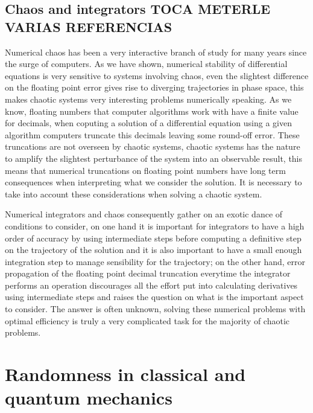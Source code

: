 \subsection{Chaos and integrators TOCA METERLE VARIAS REFERENCIAS}

Numerical chaos has been a very interactive branch of study for many years since the surge of computers. As we have shown, numerical stability of differential equations is very sensitive to systems involving chaos, even the slightest difference on the floating point error gives rise to diverging trajectories in phase space, this makes chaotic systems very interesting problems numerically speaking. As we know, floating numbers that computer algorithms work with have a finite value for decimals, when coputing a solution of a differential equation using a given algorithm computers truncate this decimals leaving some round-off error. These truncations are not overseen by chaotic systems, chaotic systems has the nature to amplify the slightest perturbance of the system into an observable result, this means that numerical truncations on floating point numbers have long term consequences when interpreting what we consider the solution. It is necessary to take into account these considerations when solving a chaotic system.\par

Numerical integrators and chaos consequently gather on an exotic dance of conditions to consider, on one hand it is important for integrators to have a high order of accuracy by using intermediate steps before computing a definitive step on the trajectory of the solution and it is also important to have a small enough integration step to manage sensibility for the trajectory; on the other hand, error propagation of the floating point decimal truncation everytime the integrator performs an operation discourages all the effort put into calculating derivatives using intermediate steps and raises the question on what is the important aspect to consider. The answer is often unknown, solving these numerical problems with optimal efficiency is truly a very complicated task for the majority of chaotic problems.



\section{Randomness in classical and quantum mechanics}

